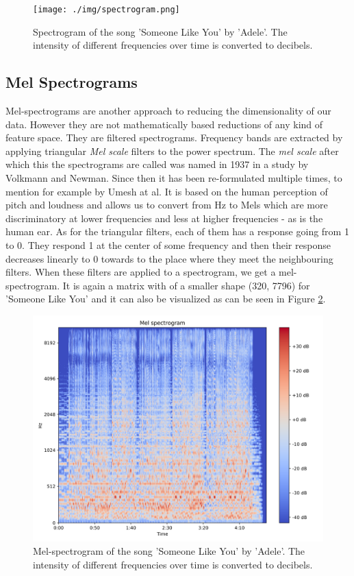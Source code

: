 \begin{figure}[h!]
    \centering
	\texttt{[image: ./img/spectrogram.png]}
	\caption{Spectrogram of the song 'Someone Like You' by 'Adele'. The intensity of different frequencies over time is converted to decibels.}
	\label{fig:ilustrative_specrogram}
\end{figure}


\subsection{Mel Spectrograms}\label{ssec:mel_spectrograms_intro}
Mel-spectrograms are another approach to reducing the dimensionality of our data. However they are not mathematically based reductions of any kind of feature space. They are filtered spectrograms. Frequency bands are extracted by applying triangular \textit{Mel scale} filters to the power spectrum. The \textit{mel scale} after which this the spectrograms are called was named in 1937 in a study \cite{1937ASAJ....8..185S} by Volkmann and Newman. Since then it has been re-formulated multiple times, to mention for example \cite{mel_scale_fit} by Umesh at al. It is based on the human perception of pitch and loudness and allows us to convert from Hz to Mels which are more discriminatory at lower frequencies and less at higher frequencies - as is the human ear. As for the triangular filters, each of them has a response going from 1 to 0. They respond 1 at the center of some frequency and then their response decreases linearly to 0 towards to the place where they meet the neighbouring filters. When these filters are applied to a spectrogram, we get a mel-spectrogram. It is again a matrix with of a smaller shape (320, 7796) for 'Someone Like You' and it can also be visualized as can be seen in Figure \ref{fig:ilustrative_melspecrogram}.

\begin{figure}[h!]
    \centering
	\includegraphics[width=140mm]{./img/melspectrogram.png}
	\caption{Mel-spectrogram of the song 'Someone Like You' by 'Adele'. The intensity of different frequencies over time is converted to decibels.}
	\label{fig:ilustrative_melspecrogram}
\end{figure}

